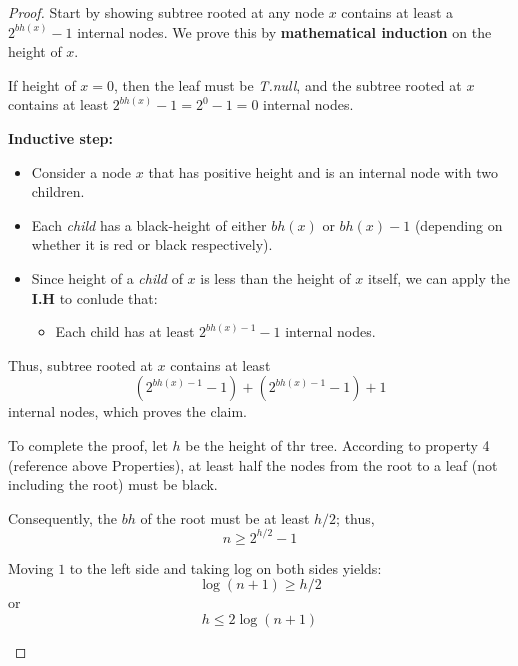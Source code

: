 \documentclass[10pt, 
a4paper, 
oneside, 
headinclude, footinclude, 
BCOR5mm]
{scrartcl}
\begin{document}
\begin{proof}
    Start by showing subtree rooted at any node $x$ contains at least a $2^{bh(x)}-1$ internal nodes. We prove this by \textbf{mathematical induction} on the height of $x$.
    \begin{description}
        \item [\textbf{Claim:}] If height of $x=0$, then the leaf must be \textit{T.null}, and the subtree rooted at $x$ contains at least $2^{bh(x)}-1=2^0-1=0$ internal nodes.
        \begin{description}
            \item \textbf{Inductive step:} 
            \begin{itemize}
                \item Consider a node $x$ that has positive height and is an internal node with two children.
                \item Each \textit{child} has a black-height of either $bh(x)$ or $bh(x)-1$ (depending on whether it is {\color{red}red} or black respectively).
                \item Since height of a \textit{child} of $x$ is less than the height of $x$ itself, we can apply the \textbf{I.H} to conlude that:
                \begin{itemize}
                    \item Each child has at least $2^{bh(x)-1}-1$ internal nodes.
                \end{itemize}
            \end{itemize}
            \item Thus, subtree rooted at $x$ contains at least $$(2^{bh(x)-1}-1)+(2^{bh(x)-1}-1)+1$$ internal nodes, which proves the claim.
        \end{description} 
        \item To complete the proof, let $h$ be the height of thr tree. According to property 4 (reference above Properties), at least half the nodes from the root 
        to a leaf (not including the root) must be black.
        \item Consequently, the $bh$ of the root must be at least $h/2$; thus, $$n \geq 2^{h/2}-1$$
        \item Moving $1$ to the left side and taking log on both sides yields: $$\log(n+1) \geq h/2$$ or $$h \leq 2\log(n+1)$$
    \end{description}
\end{proof}
\newpage
\end{document}
